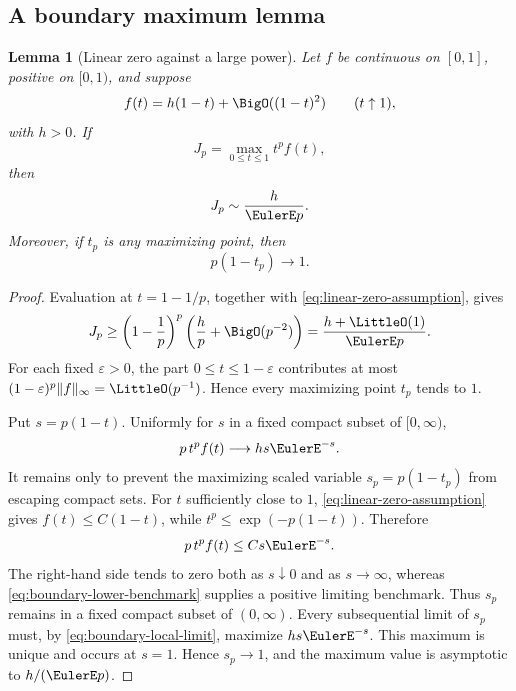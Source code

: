 \documentclass[11pt,oneside]{article}
\newtheorem{lemma}[lemma]{Lemma}
\theoremstyle{definition}
\theoremstyle{remark}
\begin{document}
\subsection{A boundary maximum lemma}

\begin{lemma}[Linear zero against a large power]
\label{lem:boundary-maximum}
Let \(f\) be continuous on \([0,1]\), positive on \([0,1)\), and suppose
\begin{equation}
 f(t)=h(1-t)+\BigO((1-t)^2)
 \qquad(t\uparrow1),
 \label{eq:linear-zero-assumption}
\end{equation}
with \(h>0\).  If
\[
 J_p=\max_{0\le t\le1}t^pf(t),
\]
then
\begin{equation}
 J_p\sim\frac{h}{\EulerE p}.
 \label{eq:boundary-max-value}
\end{equation}
Moreover, if \(t_p\) is any maximizing point, then
\begin{equation}
 p(1-t_p)\longrightarrow1.
 \label{eq:boundary-max-location}
\end{equation}
\end{lemma}

\begin{proof}
Evaluation at \(t=1-1/p\), together with
\eqref{eq:linear-zero-assumption}, gives
\begin{equation}
 J_p\ge \left(1-\frac1p\right)^p
 \left(\frac hp+\BigO(p^{-2})\right)
 =\frac{h+\LittleO(1)}{\EulerE p}.
 \label{eq:boundary-lower-benchmark}
\end{equation}
For each fixed \(\varepsilon>0\), the part \(0\le t\le1-\varepsilon\)
contributes at most
\((1-\varepsilon)^p\|f\|_\infty=\LittleO(p^{-1})\).  Hence every maximizing
point \(t_p\) tends to \(1\).

Put \(s=p(1-t)\).  Uniformly for \(s\) in a fixed compact subset of
\([0,\infty)\),
\begin{equation}
 p\,t^pf(t)\longrightarrow hs\EulerE^{-s}.
 \label{eq:boundary-local-limit}
\end{equation}
It remains only to prevent the maximizing scaled variable
\(s_p=p(1-t_p)\) from escaping compact sets.  For \(t\) sufficiently close
to \(1\), \eqref{eq:linear-zero-assumption} gives
\(f(t)\le C(1-t)\), while
\(t^p\le\exp(-p(1-t))\).  Therefore
\begin{equation}
 p\,t^pf(t)\le C s\EulerE^{-s}.
 \label{eq:boundary-tail-control}
\end{equation}
The right-hand side tends to zero both as \(s\downarrow0\) and as
\(s\to\infty\), whereas \eqref{eq:boundary-lower-benchmark} supplies a
positive limiting benchmark.  Thus \(s_p\) remains in a fixed compact
subset of \((0,\infty)\).  Every subsequential limit of \(s_p\) must, by
\eqref{eq:boundary-local-limit}, maximize \(hs\EulerE^{-s}\).  This maximum is
unique and occurs at \(s=1\).  Hence \(s_p\to1\), and the maximum value is
asymptotic to \(h/(\EulerE p)\).
\end{proof}
\end{document}
